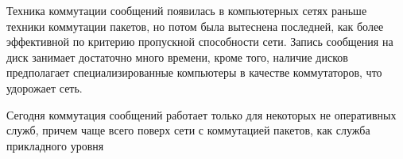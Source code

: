 Техника коммутации сообщений появилась в компьютерных сетях раньше техники коммутации пакетов, но потом была вытеснена последней, как более эффективной по критерию пропускной способности сети.
Запись сообщения на диск занимает достаточно много времени, кроме того, наличие дисков предполагает специализированные компьютеры в качестве коммутаторов, что удорожает сеть.

Сегодня коммутация сообщений работает только для некоторых не оперативных служб, причем чаще всего поверх сети с коммутацией пакетов, как служба прикладного уровня

